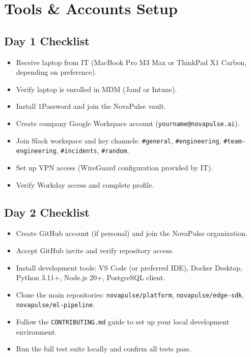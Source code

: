 \documentclass[
    language=english,
    doctype=onboarding-guide,
    institution=none,
]{../../omnilatex}
\begin{document}
\section{Tools \& Accounts Setup}

\subsection{Day 1 Checklist}

\begin{itemize}
    \item[\(\square\)] Receive laptop from IT (MacBook Pro M3 Max or
          ThinkPad X1 Carbon, depending on preference).
    \item[\(\square\)] Verify laptop is enrolled in MDM (Jamf or Intune).
    \item[\(\square\)] Install 1Password and join the NovaPulse vault.
    \item[\(\square\)] Create company Google Workspace account
          (\texttt{yourname@novapulse.ai}).
    \item[\(\square\)] Join Slack workspace and key channels:
          \texttt{\#general}, \texttt{\#engineering}, \texttt{\#team-engineering},
          \texttt{\#incidents}, \texttt{\#random}.
    \item[\(\square\)] Set up VPN access (WireGuard configuration provided
          by IT).
    \item[\(\square\)] Verify Workday access and complete profile.
\end{itemize}

\subsection{Day 2 Checklist}

\begin{itemize}
    \item[\(\square\)] Create GitHub account (if personal) and join the
          NovaPulse organization.
    \item[\(\square\)] Accept GitHub invite and verify repository access.
    \item[\(\square\)] Install development tools: VS Code (or preferred IDE),
          Docker Desktop, Python 3.11+, Node.js 20+, PostgreSQL client.
    \item[\(\square\)] Clone the main repositories:
          \texttt{novapulse/platform}, \texttt{novapulse/edge-sdk},
          \texttt{novapulse/ml-pipeline}.
    \item[\(\square\)] Follow the \texttt{CONTRIBUTING.md} guide to set up
          your local development environment.
    \item[\(\square\)] Run the full test suite locally and confirm all tests
          pass.
\end{itemize}
\end{document}
